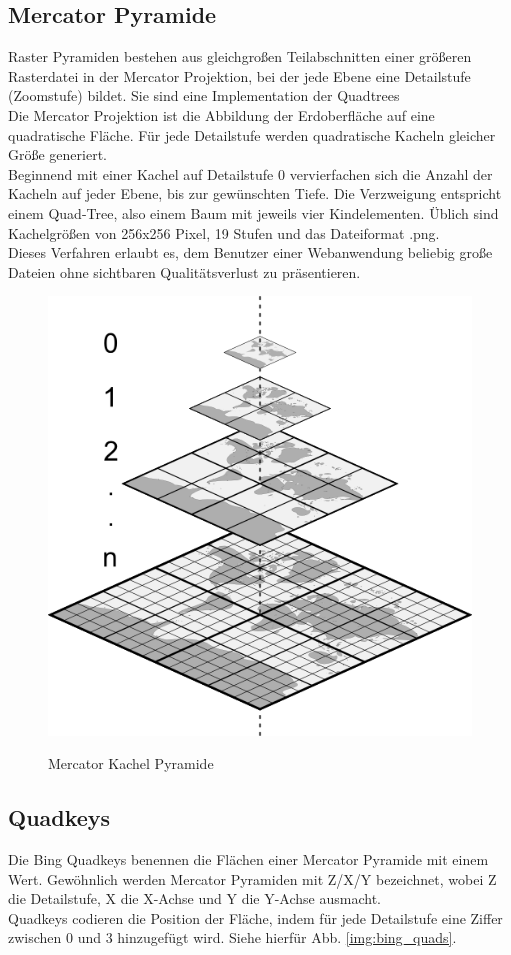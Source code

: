 \documentclass[10pt,conference,compsocconf]{IEEEtran}
\begin{document}
\subsection{Mercator Pyramide}
Raster Pyramiden bestehen aus gleichgroßen Teilabschnitten einer größeren Rasterdatei in der Mercator Projektion, bei der jede Ebene eine Detailstufe (Zoomstufe) bildet. Sie sind eine Implementation der Quadtrees \\
Die Mercator Projektion ist die Abbildung der Erdoberfläche auf eine quadratische Fläche. Für jede Detailstufe werden quadratische Kacheln gleicher Größe generiert. \\
Beginnend mit einer Kachel auf Detailstufe 0 vervierfachen sich die Anzahl der Kacheln auf jeder Ebene, bis zur gewünschten Tiefe. Die Verzweigung entspricht einem Quad-Tree, also einem Baum mit jeweils vier Kindelementen. Üblich sind Kachelgrößen von 256x256 Pixel, 19 Stufen und das Dateiformat .png. \\
Dieses Verfahren erlaubt es, dem Benutzer einer Webanwendung beliebig große Dateien ohne sichtbaren Qualitätsverlust zu präsentieren.\\
\begin{figure}[H]
	\centering
	\includegraphics[width=0.6\columnwidth]{img/mercator_pyramid.png}\\
	\caption[]{Mercator Kachel Pyramide}
	\label{img:mercator_pyramid}
\end{figure}


\subsection{Quadkeys}
Die Bing Quadkeys benennen die Flächen einer Mercator Pyramide mit einem Wert. Gewöhnlich werden Mercator Pyramiden mit Z/X/Y bezeichnet, wobei Z die Detailstufe, X die X-Achse und Y die Y-Achse ausmacht.\\
Quadkeys codieren die Position der Fläche, indem für jede Detailstufe eine Ziffer zwischen 0 und 3 hinzugefügt wird. Siehe hierfür Abb. \ref{img:bing_quads}.
\end{document}
